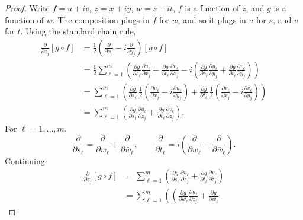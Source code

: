 \documentclass[12pt,openany]{book}
\theoremstyle{plain}
\theoremstyle{remark}
\theoremstyle{definition}
\theoremstyle{exercise}
\theoremstyle{example}
\begin{document}
\begin{proof}
Write $f = u+iv$, $z = x+iy$, $w=s+it$,
$f$ is a function of $z$, and $g$ is a function of $w$.
The composition plugs in $f$ for $w$, and so it plugs in $u$ for $s$, and
$v$ for $t$.
Using the standard chain rule,
\begin{equation*}
\begin{split}
\frac{\partial}{\partial z_j} \left[ g \circ f \right]
& =
\frac{1}{2}
\left(
\frac{\partial}{\partial x_j} - i
\frac{\partial}{\partial y_j}
\right)
 \left[ g \circ f \right]
\\
& = 
\frac{1}{2}
\sum_{\ell=1}^m \left(
\frac{\partial g}{\partial s_\ell} \frac{\partial u_\ell}{\partial x_j}
+
\frac{\partial g}{\partial t_\ell} \frac{\partial v_\ell}{\partial x_j}
-
i
\left(
\frac{\partial g}{\partial s_\ell} \frac{\partial u_\ell}{\partial y_j}
+
\frac{\partial g}{\partial t_\ell} \frac{\partial v_\ell}{\partial y_j}
\right)
\right)
\\
& = 
\sum_{\ell=1}^m \left(
\frac{\partial g}{\partial s_\ell}
\,
\frac{1}{2}
\left(
\frac{\partial u_\ell}{\partial x_j}
-
i
\frac{\partial u_\ell}{\partial y_j}
\right)
+
\frac{\partial g}{\partial t_\ell}
\,
\frac{1}{2}
\left(
\frac{\partial v_\ell}{\partial x_j}
-
i
\frac{\partial v_\ell}{\partial y_j}
\right)
\right)
\\
& = 
\sum_{\ell=1}^m \left(
\frac{\partial g}{\partial s_\ell}
\frac{\partial u_\ell}{\partial z_j}
+
\frac{\partial g}{\partial t_\ell}
\frac{\partial v_\ell}{\partial z_j}
\right) .
\end{split}
\end{equation*}
For $\ell = 1, \ldots, m$,
\begin{equation*}
\frac{\partial}{\partial s_\ell}
=
\frac{\partial}{\partial w_\ell}
+
\frac{\partial}{\partial \bar{w}_\ell} ,
\qquad
\frac{\partial}{\partial t_\ell}
=
i \left(
\frac{\partial}{\partial w_\ell}
-
\frac{\partial}{\partial \bar{w}_\ell}
\right) .
\end{equation*}
Continuing:
\begin{equation*}
\begin{split}
\frac{\partial}{\partial z_j} \left[ g \circ f \right]
& = 
\sum_{\ell=1}^m \left(
\frac{\partial g}{\partial s_\ell}
\frac{\partial u_\ell}{\partial z_j}
+
\frac{\partial g}{\partial t_\ell}
\frac{\partial v_\ell}{\partial z_j}
\right)
\\
& = 
\sum_{\ell=1}^m \left(
\left(
\frac{\partial g}{\partial w_\ell}
\frac{\partial u_\ell}{\partial z_j}
+
\frac{\partial g}{\partial \bar{w}_\ell}

\end{split}
\end{equation*}
\end{proof}
\end{document}
